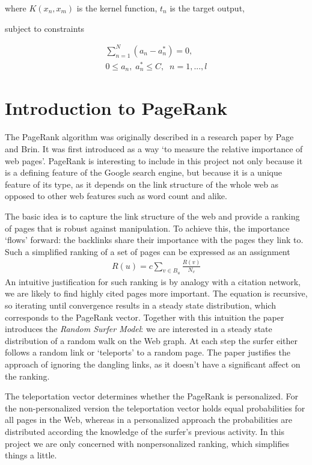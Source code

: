 \documentclass[12pt,notitlepage,twoside]{scrreprt}
\begin{document}
where \(K(x_n,x_m) \) is the kernel function, \(t_n\) is the target output,

subject to constraints

\begin{gather}
  \sum_{n=1}^{N}(a_n-a_n^*)=0,\\
  0\leq a_n,\; a_n^*\leq C,\;\;    n=1,...,l 
\end{gather}


\section{Introduction to PageRank}
The PageRank algorithm was originally described in a research paper
by Page and Brin\cite{PageRank}. It was first introduced as a way `to measure
the relative importance of web pages'. PageRank is interesting to include in
this project not only because it is a defining feature of the Google search
engine, but because it is a unique feature of its type, as it depends on the link
structure of the whole web as opposed to other  web features such as word count
and alike.

The basic idea is to capture the link structure of the web and provide a
ranking of pages that is robust against manipulation. To achieve this, the
importance `flows' forward: the backlinks share their importance with the pages
they link to. Such a simplified ranking of a set of pages can be expressed as an assignment
\begin{gather}
  R(u)=c\sum_{v\in B_u}\frac{R(v)}{N_v}
\end{gather}
An intuitive justification for such ranking is by analogy with a citation
network, we are likely to find highly cited pages more important.
The equation is recursive, so iterating until convergence results in a steady
state distribution, which corresponds to the PageRank vector.
Together with this intuition the paper introduces the \textit{Random Surfer
Model}: we are interested in a steady state distribution of a random walk on
the Web graph. At each step the surfer either follows a random link or
`teleports' to a random page. The paper justifies the approach of ignoring the
dangling links, as it doesn't have a significant affect on the ranking. 

The teleportation vector determines whether the PageRank is personalized. For
the non-personalized version the teleportation vector holds equal probabilities
for all pages in the Web, whereas in a personalized approach the probabilities
are distributed according the knowledge of the surfer's previous activity. In
this project we are only concerned with nonpersonalized ranking, which
simplifies things a little.
\end{document}
